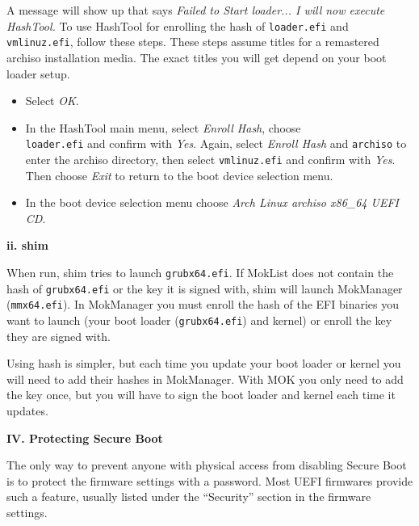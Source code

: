 \documentclass{exam-zh}
\begin{document}
A message will show up that says \textit{Failed to Start loader... I will now execute HashTool.} To use HashTool for enrolling the hash of \texttt{loader.efi} and \texttt{vmlinuz.efi}, follow these steps. These steps assume titles for a remastered archiso installation media. The exact titles you will get depend on your boot loader setup.

\begin{itemize}
  \item Select \textit{OK}.

  \item In the HashTool main menu, select \textit{Enroll Hash}, choose \texttt{\\loader.efi} and confirm with \textit{Yes}. Again, select \textit{Enroll Hash} and \texttt{archiso} to enter the archiso directory, then select \texttt{vmlinuz.efi} and confirm with \textit{Yes}. Then choose \textit{Exit} to return to the boot device selection menu.

  \item In the boot device selection menu choose \textit{Arch Linux archiso x86\_64 UEFI CD}.
\end{itemize}

\textbf{ii. shim}

When run, shim tries to launch \texttt{grubx64.efi}. If MokList does not contain the hash of \texttt{grubx64.efi} or the key it is signed with, shim will launch MokManager (\texttt{mmx64.efi}). In MokManager you must enroll the hash of the EFI binaries you want to launch (your boot loader (\texttt{grubx64.efi}) and kernel) or enroll the key they are signed with.

Using hash is simpler, but each time you update your boot loader or kernel you will need to add their hashes in MokManager. With MOK you only need to add the key once, but you will have to sign the boot loader and kernel each time it updates.

\par
\endgroup

\textbf{IV. Protecting Secure Boot}

The only way to prevent anyone with physical access from disabling Secure Boot is to protect the firmware settings with a password. Most UEFI firmwares provide such a feature, usually listed under the ``Security'' section in the firmware settings.
\end{document}
